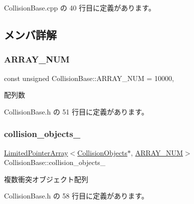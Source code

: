  Collision\+Base.\+cpp の 40 行目に定義があります。



\subsection{メンバ詳解}
\mbox{\label{class_collision_base_a0ddcdd5ed993b19c6edabd9c50e76ba4}} 
\subsubsection{\texorpdfstring{A\+R\+R\+A\+Y\+\_\+\+N\+UM}{ARRAY\_NUM}}
{\footnotesize\ttfamily const unsigned Collision\+Base\+::\+A\+R\+R\+A\+Y\+\_\+\+N\+UM = 10000\hspace{0.3cm}{\ttfamily [static]}, {\ttfamily [private]}}



配列数 



 Collision\+Base.\+h の 51 行目に定義があります。

\mbox{\label{class_collision_base_a9ef8dfac9a07e31cb1d058b6a22e9640}} 
\subsubsection{\texorpdfstring{collision\+\_\+objects\+\_\+}{collision\_objects\_}}
{\footnotesize\ttfamily \mbox{\hyperlink{class_limited_pointer_array}{Limited\+Pointer\+Array}}$<$\mbox{\hyperlink{class_collision_objects}{Collision\+Objects}}$\ast$, \mbox{\hyperlink{class_collision_base_a0ddcdd5ed993b19c6edabd9c50e76ba4}{A\+R\+R\+A\+Y\+\_\+\+N\+UM}}$>$ Collision\+Base\+::collision\+\_\+objects\+\_\+\hspace{0.3cm}{\ttfamily [private]}}



複数衝突オブジェクト配列 



 Collision\+Base.\+h の 58 行目に定義があります。

